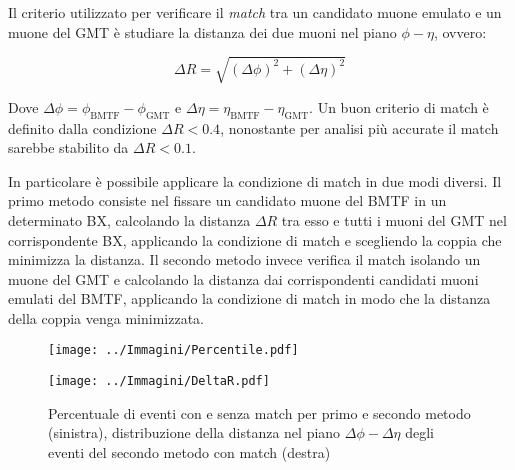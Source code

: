 Il criterio utilizzato per verificare il \textit{match} tra un candidato muone emulato e un muone del GMT è studiare la distanza dei due muoni nel piano $\phi - \eta$, ovvero:

\begin{equation}
  \label{eq:DeltaR}
  \Delta R = \sqrt{(\Delta \phi)^2 + (\Delta \eta)^2}
\end{equation}

Dove $\Delta \phi = \phi_{\mathrm{BMTF}} - \phi_{\mathrm{GMT}}$ e $\Delta \eta = \eta_{\mathrm{BMTF}} - \eta_{\mathrm{GMT}}$. Un buon criterio di match è definito dalla condizione $\Delta R < 0.4$, nonostante per analisi più accurate il match sarebbe stabilito da $\Delta R < 0.1$.

In particolare è possibile applicare la condizione di match in due modi diversi. Il primo metodo consiste nel fissare un candidato muone del BMTF in un determinato BX, calcolando la distanza $\Delta R$ tra esso e tutti i muoni del GMT nel corrispondente BX, applicando la condizione di match e scegliendo la coppia che minimizza la distanza. \newline
Il secondo metodo invece verifica il match isolando un muone del GMT e calcolando la distanza dai corrispondenti candidati muoni emulati del BMTF, applicando la condizione di match in modo che la distanza della coppia venga minimizzata.




\begin{figure}[t]
  \centering
  \begin{minipage}[b]{0.45\textwidth}
    \centering
    \texttt{[image: ../Immagini/Percentile.pdf]} 
    \end{minipage}
    \hfill 
    \begin{minipage}[b]{0.49\textwidth}
      \centering
      \texttt{[image: ../Immagini/DeltaR.pdf]} 
    \end{minipage}
    \caption{Percentuale di eventi con e senza match per primo e secondo metodo (sinistra), distribuzione della distanza nel piano $\Delta \phi - \Delta \eta$ degli eventi del secondo metodo con match (destra)}
  \label{fig:DeltaR}
\end{figure}


